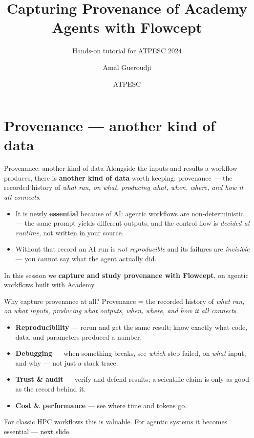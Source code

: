 \documentclass[aspectratio=169,11pt]{beamer}
\title{Capturing Provenance of Academy Agents with Flowcept}
\subtitle{Hands-on tutorial for ATPESC 2024}
\author{Amal Gueroudji}
\date{ATPESC}
\institute{Argonne National Laboratory}
\begin{document}
\maketitle

\section{Provenance --- another kind of data}

\begin{frame}{Provenance: another kind of data}
  Alongside the inputs and results a workflow produces, there is \textbf{another kind
  of data} worth keeping: \alert{provenance} --- the recorded history of \emph{what
  ran, on what, producing what, when, where, and how it all connects}.
  \vspace{0.5em}
  \begin{itemize}
    \item It is newly \textbf{essential} because of AI: \alert{agentic workflows are
      non-deterministic} --- the same prompt yields different outputs, and the control
      flow is \emph{decided at runtime}, not written in your source.
    \item Without that record an AI run is \emph{not reproducible} and its failures are
      \emph{invisible} --- you cannot say what the agent actually did.
  \end{itemize}
  \vspace{0.3em}
  \centering In this session we \textbf{capture and study provenance with
  \alert{Flowcept}}, on agentic workflows built with \alert{Academy}.
\end{frame}

\begin{frame}{Why capture provenance at all?}
  Provenance = the recorded history of \emph{what ran, on what inputs, producing
  what outputs, when, where, and how it all connects}.
  \vspace{0.5em}
  \begin{itemize}
    \item \textbf{Reproducibility} --- rerun and get the same result; know exactly
      what code, data, and parameters produced a number.
    \item \textbf{Debugging} --- when something breaks, see \emph{which} step failed,
      on \emph{what} input, and why --- not just a stack trace.
    \item \textbf{Trust \& audit} --- verify and defend results; a scientific claim
      is only as good as the record behind it.
    \item \textbf{Cost \& performance} --- see where time and tokens go.
  \end{itemize}
  \vspace{0.3em}
  \small For classic HPC workflows this is valuable. For \alert{agentic} systems it
  becomes \alert{essential} --- next slide.
\end{frame}
\end{document}
